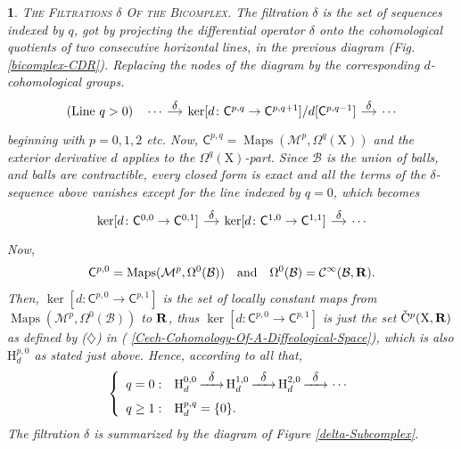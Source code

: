 \documentclass[12pt,reqno]{amsart}
\theoremstyle{article}
\newtheorem{article}{}
\def\artlabel[#1]{\textsc{#1}.}
\newcommand{\art}[1]{(\text{\textsection} \ref{#1})}
\newcommand{\rfl}[1]{\,{\buildrel{\displaystyle{#1}}\over{\hbox to 7mm{\rightarrowfill}}}\,}
\def \H{\mathrm H}
\def \X{\mathrm X}
\newcommand{\RR}{{\bf R}}
\newcommand{\cB}{{\mathcal B}}
\newcommand{\cM}{\mathcal{M}}
\newcommand{\sC}{\mathsf{C}}
\newcommand{\Cinfty}{{\mathcal C}^{\infty}}
\DeclareMathOperator{\Maps}{Maps}
\newcommand{\vC}{\check{\mathrm{C}}}
\def \H{\mathrm H}
\begin{document}
  \begin{article}\artlabel[The Filtrations $\delta$ Of the Bicomplex]
    The filtration $\delta$ is the set of sequences indexed by $q$,
    got by projecting the differential operator $\delta$ onto the cohomological quotients of two consecutive horizontal lines,
    in the previous diagram (Fig. \ref{bicomplex-CDR}).
    Replacing the nodes of the diagram by the corresponding $d$-cohomological groups.
    $$
    \begin{tikzcd}[column sep=small,every label/.append style = {font = \small}]
      \text{(Line $q > 0$)} \quad \cdots \arrow[r, "\delta"] & \ker[d \colon \sC^{p,q} \to \sC^{p,q+1}]/d[\sC^{p,q-1}] \arrow[r, "\delta"] &  \cdots
    \end{tikzcd}
    $$
    beginning with $p = 0,1,2$ etc.
    Now,
    $\sC^{p,q} = \Maps(\cM^p,\Omega^q(\X))$ and the exterior derivative $d$ applies to the $\Omega^q(\X)$-part.
    Since $\cB$ is the union of balls,
    and balls are contractible,
    every closed form is exact and all the terms of the $\delta$-sequence above vanishes except for the line indexed by $q = 0$,
    which becomes
    $$
    \begin{tikzcd}[column sep=small,every label/.append style = {font = \small}]
      \ker[d \colon \sC^{0,0} \to \sC^{0,1}] \arrow[r, "\delta"] &  \ker[d \colon \sC^{1,0} \to \sC^{1,1}] \arrow[r,"\delta"] & \cdots
    \end{tikzcd}
    $$
    Now,
    $$
    \sC^{p,0} = \Maps(\cM^p,\Omega^0(\cB))
    \quad \text{and} \quad
    \Omega^0(\cB) = \Cinfty(\cB,\RR).
    $$
    Then,
    $\ker[d \colon \sC^{p,0} \to \sC^{p,1}]$ is the set of locally constant maps from $\Maps(\cM^p,\Omega^0(\cB))$ to $\RR$,
    thus $\ker[d \colon \sC^{p,0} \to \sC^{p,1}]$ is just the set $\vC^p(\X,\RR)$ as defined by ($\diamondsuit$) in \art{Cech-Cohomology-Of-A-Diffeological-Space},
    which is also $ \H^{p,0}_d$ as stated just above.
    Hence,
    according to all that,
    $$
    \left\{
    \begin{array}{ll}
      q = 0 :    & \H_d^{0,0} \rfl{\delta}  \H_d^{1,0} \rfl{\delta}  \H_d^{2,0} \rfl{\delta}  \cdots \\[.25cm]
      q \geq 1 : & \H^{p,q}_d = \{0\}.
    \end{array}
    \right.
    $$
    The filtration $\delta$ is summarized by the diagram of Figure \ref{delta-Subcomplex}.
    \begin{figure}[ht]
      $$
      \begin{tikzcd}[column sep=small,every label/.append style = {font = \small}]

\end{tikzcd}$$
\end{figure}
\end{article}
\end{document}
